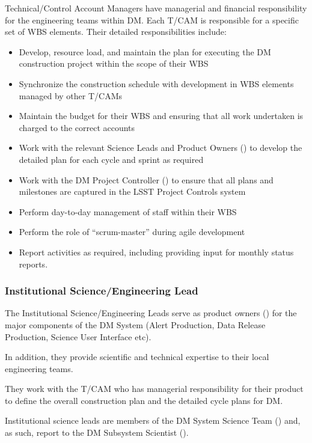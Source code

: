 Technical/Control Account Managers have managerial and financial responsibility
for the engineering teams within DM. Each T/CAM is responsible for a specific set of WBS elements. Their detailed responsibilities include:

\begin{itemize}

  \item{Develop, resource load, and maintain the plan for executing the DM construction project within the scope of their WBS}
  \item{Synchronize the construction schedule with development in WBS elements managed by other T/CAMs}
  \item{Maintain the budget for their WBS and ensuring that all work undertaken is charged to the correct accounts}
  \item{Work with the relevant Science Leads and Product Owners () to develop the detailed plan for each cycle and sprint as required}
  \item{Work with the DM Project Controller () to ensure that all plans and milestones are captured in the LSST Project Controls system}
  \item{Perform day-to-day management of staff within their WBS}
  \item{Perform the role of ``scrum-master'' during agile development}
  \item{Report activities as required, including providing input for monthly status reports.}

\end{itemize}

\subsubsection{Institutional Science/Engineering Lead \label{role:scilead}}

The Institutional Science/Engineering Leads serve as product owners () for the major components of the DM System (Alert Production, Data Release Production, Science User Interface etc).

In addition, they provide scientific and technical expertise to their local engineering teams.

They work with the T/CAM who has managerial responsibility for their product to define the overall construction plan and the detailed cycle plans for DM.

Institutional science leads are members of the DM System Science Team () and, as such, report to the DM Subsystem Scientist ().


